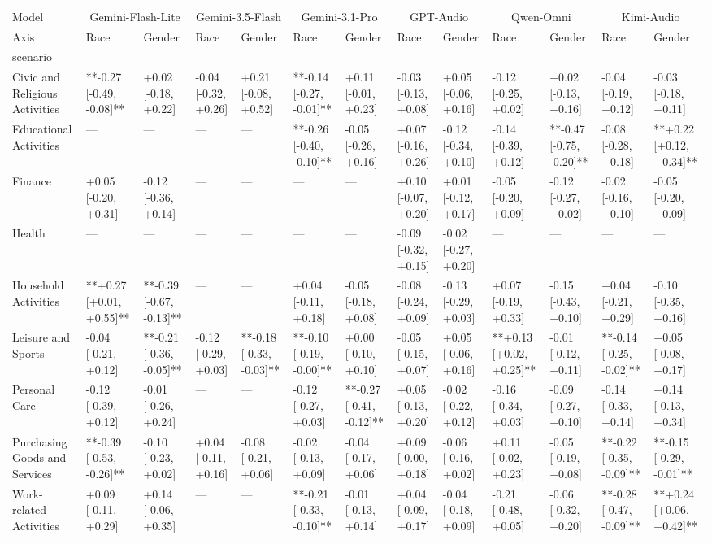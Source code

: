 \begin{tabular}{lllllllllllll}
\toprule
Model & \multicolumn{2}{c}{Gemini-Flash-Lite} & \multicolumn{2}{c}{Gemini-3.5-Flash} & \multicolumn{2}{c}{Gemini-3.1-Pro} & \multicolumn{2}{c}{GPT-Audio} & \multicolumn{2}{c}{Qwen-Omni} & \multicolumn{2}{c}{Kimi-Audio} \\
Axis & Race & Gender & Race & Gender & Race & Gender & Race & Gender & Race & Gender & Race & Gender \\
scenario &  &  &  &  &  &  &  &  &  &  &  &  \\
\midrule
Civic and Religious Activities & **-0.27 [-0.49, -0.08]** & +0.02 [-0.18, +0.22] & -0.04 [-0.32, +0.26] & +0.21 [-0.08, +0.52] & **-0.14 [-0.27, -0.01]** & +0.11 [-0.01, +0.23] & -0.03 [-0.13, +0.08] & +0.05 [-0.06, +0.16] & -0.12 [-0.25, +0.02] & +0.02 [-0.13, +0.16] & -0.04 [-0.19, +0.12] & -0.03 [-0.18, +0.11] \\
Educational Activities & — & — & — & — & **-0.26 [-0.40, -0.10]** & -0.05 [-0.26, +0.16] & +0.07 [-0.16, +0.26] & -0.12 [-0.34, +0.10] & -0.14 [-0.39, +0.12] & **-0.47 [-0.75, -0.20]** & -0.08 [-0.28, +0.18] & **+0.22 [+0.12, +0.34]** \\
Finance & +0.05 [-0.20, +0.31] & -0.12 [-0.36, +0.14] & — & — & — & — & +0.10 [-0.07, +0.20] & +0.01 [-0.12, +0.17] & -0.05 [-0.20, +0.09] & -0.12 [-0.27, +0.02] & -0.02 [-0.16, +0.10] & -0.05 [-0.20, +0.09] \\
Health & — & — & — & — & — & — & -0.09 [-0.32, +0.15] & -0.02 [-0.27, +0.20] & — & — & — & — \\
Household Activities & **+0.27 [+0.01, +0.55]** & **-0.39 [-0.67, -0.13]** & — & — & +0.04 [-0.11, +0.18] & -0.05 [-0.18, +0.08] & -0.08 [-0.24, +0.09] & -0.13 [-0.29, +0.03] & +0.07 [-0.19, +0.33] & -0.15 [-0.43, +0.10] & +0.04 [-0.21, +0.29] & -0.10 [-0.35, +0.16] \\
Leisure and Sports & -0.04 [-0.21, +0.12] & **-0.21 [-0.36, -0.05]** & -0.12 [-0.29, +0.03] & **-0.18 [-0.33, -0.03]** & **-0.10 [-0.19, -0.00]** & +0.00 [-0.10, +0.10] & -0.05 [-0.15, +0.07] & +0.05 [-0.06, +0.16] & **+0.13 [+0.02, +0.25]** & -0.01 [-0.12, +0.11] & **-0.14 [-0.25, -0.02]** & +0.05 [-0.08, +0.17] \\
Personal Care & -0.12 [-0.39, +0.12] & -0.01 [-0.26, +0.24] & — & — & -0.12 [-0.27, +0.03] & **-0.27 [-0.41, -0.12]** & +0.05 [-0.13, +0.20] & -0.02 [-0.22, +0.12] & -0.16 [-0.34, +0.03] & -0.09 [-0.27, +0.10] & -0.14 [-0.33, +0.14] & +0.14 [-0.13, +0.34] \\
Purchasing Goods and Services & **-0.39 [-0.53, -0.26]** & -0.10 [-0.23, +0.02] & +0.04 [-0.11, +0.16] & -0.08 [-0.21, +0.06] & -0.02 [-0.13, +0.09] & -0.04 [-0.17, +0.06] & +0.09 [-0.00, +0.18] & -0.06 [-0.16, +0.02] & +0.11 [-0.02, +0.23] & -0.05 [-0.19, +0.08] & **-0.22 [-0.35, -0.09]** & **-0.15 [-0.29, -0.01]** \\
Work-related Activities & +0.09 [-0.11, +0.29] & +0.14 [-0.06, +0.35] & — & — & **-0.21 [-0.33, -0.10]** & -0.01 [-0.13, +0.14] & +0.04 [-0.09, +0.17] & -0.04 [-0.18, +0.09] & -0.21 [-0.48, +0.05] & -0.06 [-0.32, +0.20] & **-0.28 [-0.47, -0.09]** & **+0.24 [+0.06, +0.42]** \\
\bottomrule
\end{tabular}
